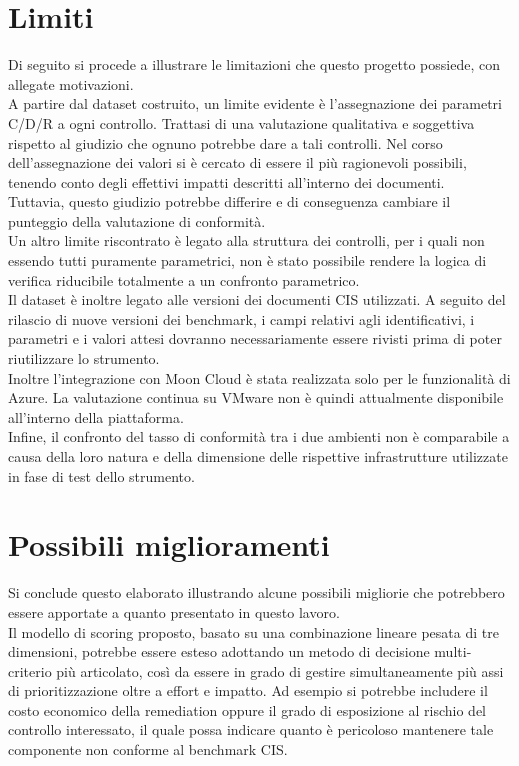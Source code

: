 \documentclass[a4paper,11pt]{report}
\begin{document}
\section{Limiti}

Di seguito si procede a illustrare le limitazioni che questo progetto possiede, con allegate motivazioni.\\
A partire dal dataset costruito, un limite evidente è l'assegnazione dei parametri C/D/R a ogni controllo. Trattasi di una valutazione qualitativa e soggettiva rispetto al giudizio che ognuno potrebbe dare a tali controlli. Nel corso dell'assegnazione dei valori si è cercato di essere il più ragionevoli possibili, tenendo conto degli effettivi impatti descritti all'interno dei documenti.\\
Tuttavia, questo giudizio potrebbe differire e di conseguenza cambiare il punteggio della valutazione di conformità.\\
Un altro limite riscontrato è legato alla struttura dei controlli, per i quali non essendo tutti puramente parametrici, non è stato possibile rendere la logica di verifica riducibile totalmente a un confronto parametrico.\\
Il dataset è inoltre legato alle versioni dei documenti CIS utilizzati. A seguito del rilascio di nuove versioni dei benchmark, i campi relativi agli identificativi, i parametri e i valori attesi dovranno necessariamente essere rivisti prima di poter riutilizzare lo strumento.\\
Inoltre l'integrazione con Moon Cloud è stata realizzata solo per le funzionalità di Azure. La valutazione continua su VMware non è quindi attualmente disponibile all'interno della piattaforma.\\
Infine, il confronto del tasso di conformità tra i due ambienti non è comparabile a causa della loro natura e della dimensione delle rispettive infrastrutture utilizzate in fase di test dello strumento.

\section{Possibili miglioramenti}

Si conclude questo elaborato illustrando alcune possibili migliorie che potrebbero essere apportate a quanto presentato in questo lavoro.\\
Il modello di scoring proposto, basato su una combinazione lineare pesata di tre dimensioni, potrebbe essere esteso adottando un metodo di decisione multi-criterio più articolato, così da essere in grado di gestire simultaneamente più assi di prioritizzazione oltre a effort e impatto. Ad esempio si potrebbe includere il costo economico della remediation oppure il grado di esposizione al rischio del controllo interessato, il quale possa indicare quanto è pericoloso mantenere tale componente non conforme al benchmark CIS. \\
\end{document}
